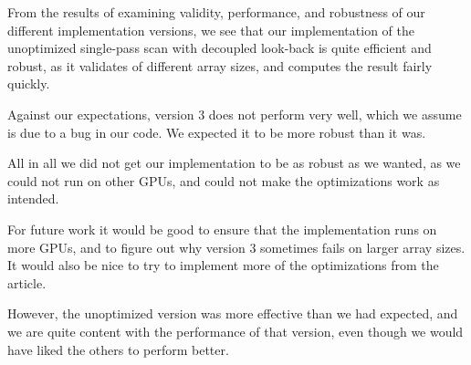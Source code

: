 From the results of examining validity, performance, and robustness of our different implementation versions, we see that our implementation of the unoptimized single-pass scan with decoupled look-back is quite efficient and robust, as it validates of different array sizes, and computes the result fairly quickly.

Against our expectations, version 3 does not perform very well, which we assume is due to a bug in our code.
We expected it to be more robust than it was.

All in all we did not get our implementation to be as robust as we wanted, as we could not run on other GPUs, and could not make the optimizations work as intended.

For future work it would be good to ensure that the implementation runs on more GPUs, and to figure out why version 3 sometimes fails on larger array sizes.
It would also be nice to try to implement more of the optimizations from the article.

However, the unoptimized version was more effective than we had expected, and we are quite content with the performance of that version, even though we would have liked the others to perform better.
